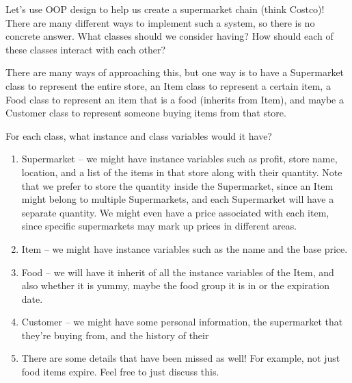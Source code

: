 \begin{blocksection}
Let's use OOP design to help us create a supermarket chain (think Costco)! There are many different ways to implement such a system, so there is no concrete answer.
\question What classes should we consider having? How should each of these classes interact with each other?
\begin{solution}[1.5in] 
There are many ways of approaching this, but one way is to have a Supermarket class to represent the entire store, an Item class to represent a certain item, a Food class to represent an item that is a food (inherits from Item), and maybe a Customer class to represent someone buying items from that store.
\end{solution}
\end{blocksection}

\begin{blocksection}
\question For each class, what instance and class variables would it have?
\begin{solution}[1.5in]
\begin{enumerate}[1.]
\item Supermarket -- we might have instance variables such as profit, store name, location, and a list of the items in that store along with their quantity. Note that we prefer to store the quantity inside the Supermarket, since an Item might belong to multiple Supermarkets, and each Supermarket will have a separate quantity. We might even have a price associated with each item, since 
specific supermarkets may mark up prices in different areas.
\item Item -- we might have instance variables such as the name and the base price.
\item Food -- we will have it inherit of all the instance variables of the Item, and also whether it is yummy, maybe the food group it is in or the expiration date.
\item Customer -- we might have some personal information, the supermarket that they're buying from, and the history of their
\item There are some details that have been missed as well! For example, not just food items expire. Feel free to just discuss this.
\end{enumerate}
\end{solution}
\end{blocksection}

